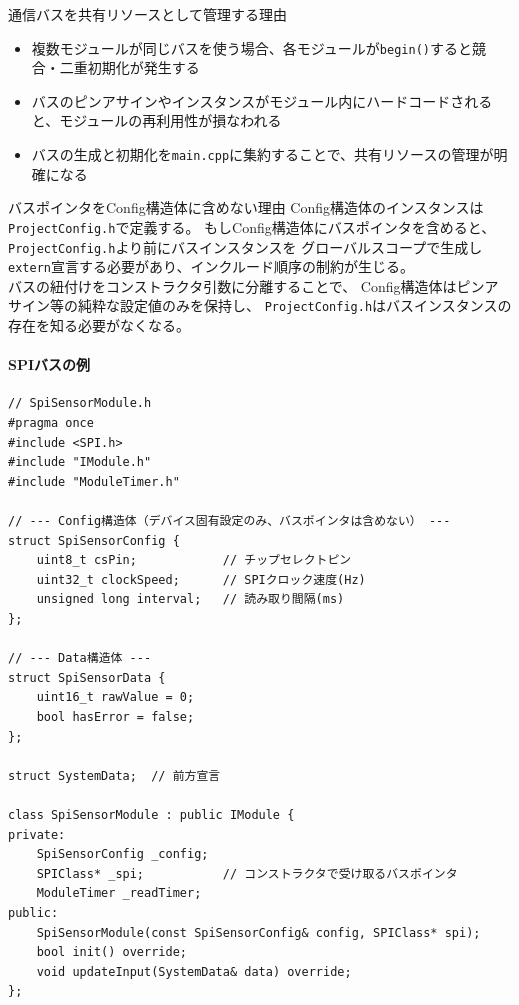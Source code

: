 \begin{funcblock}{通信バスを共有リソースとして管理する理由}
\begin{itemize}
    \item 複数モジュールが同じバスを使う場合、各モジュールが\texttt{begin()}すると競合・二重初期化が発生する
    \item バスのピンアサインやインスタンスがモジュール内にハードコードされると、モジュールの再利用性が損なわれる
    \item バスの生成と初期化を\texttt{main.cpp}に集約することで、共有リソースの管理が明確になる
\end{itemize}
\end{funcblock}

\begin{funcblock}{バスポインタをConfig構造体に含めない理由}
Config構造体のインスタンスは\texttt{ProjectConfig.h}で定義する。
もしConfig構造体にバスポインタを含めると、\texttt{ProjectConfig.h}より前にバスインスタンスを
グローバルスコープで生成し\texttt{extern}宣言する必要があり、インクルード順序の制約が生じる。\\
バスの紐付けをコンストラクタ引数に分離することで、
Config構造体はピンアサイン等の純粋な設定値のみを保持し、
\texttt{ProjectConfig.h}はバスインスタンスの存在を知る必要がなくなる。
\end{funcblock}

\paragraph{SPIバスの例}

\begin{lstlisting}[style=cppstyle, caption={SPIバスを使用するモジュールのヘッダー}]
// SpiSensorModule.h
#pragma once
#include <SPI.h>
#include "IModule.h"
#include "ModuleTimer.h"

// --- Config構造体（デバイス固有設定のみ、バスポインタは含めない） ---
struct SpiSensorConfig {
    uint8_t csPin;            // チップセレクトピン
    uint32_t clockSpeed;      // SPIクロック速度(Hz)
    unsigned long interval;   // 読み取り間隔(ms)
};

// --- Data構造体 ---
struct SpiSensorData {
    uint16_t rawValue = 0;
    bool hasError = false;
};

struct SystemData;  // 前方宣言

class SpiSensorModule : public IModule {
private:
    SpiSensorConfig _config;
    SPIClass* _spi;           // コンストラクタで受け取るバスポインタ
    ModuleTimer _readTimer;
public:
    SpiSensorModule(const SpiSensorConfig& config, SPIClass* spi);
    bool init() override;
    void updateInput(SystemData& data) override;
};
\end{lstlisting}

